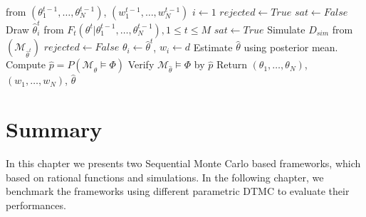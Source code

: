 \begin{algorithm}[H]
\begin{algorithmic}[1]
        \hspace{3cm} from $(\theta^{t-1}_1,\ldots,\theta^{t-1}_N)$, $(w^{t-1}_1,\ldots,w^{t-1}_N)$  
        \State $i \leftarrow 1$
         
        \State $rejected \leftarrow True$
        \State $sat \leftarrow False $
        \State Draw $\hat{\theta}^t_i$ from $F_t(\theta^t | \theta^{t-1}_1,\ldots,\theta^{t-1}_N), 1\leq t \leq M$
        \State $sat \leftarrow True$
        \EndIf
        \EndWhile
        \State Simulate $D_{sim}$ from $(\mathcal{M}_{\hat{\theta}^t})$
        \State $rejected \leftarrow False$
        \State $\theta_i \leftarrow \hat{\theta}^t$, $w_i \leftarrow d$
        \EndIf
        \EndWhile
        \EndWhile
        \EndWhile
        \State Estimate $\hat{\theta}$ using posterior mean.
        \State Compute $\hat{p}=P(\mathcal{M}_{\hat{\theta}}\models\Phi)$
        \State Verify $\mathcal{M}_{\hat{\theta}} \models\Phi$ by $\hat{p}$
        \State Return $(\theta_1,\ldots,\theta_{N})$, $(w_1,\ldots,w_{N})$, $\hat{\theta}$
        \EndProcedure
    \end{algorithmic}
\end{algorithm}

\section{Summary}
In this chapter we presents two Sequential Monte Carlo based frameworks, which based on rational
functions and simulations. In the following chapter, we benchmark the frameworks using different
parametric DTMC to evaluate their performances.